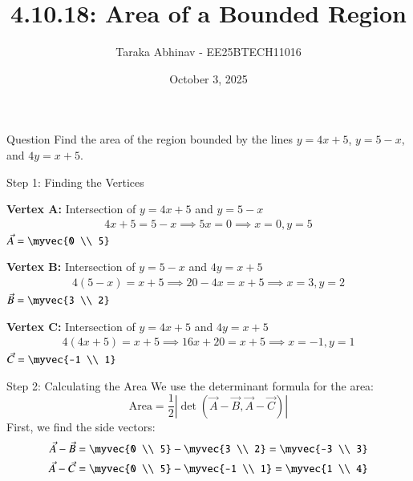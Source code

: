 \documentclass{beamer}
\begin{document}
\title{4.10.18: Area of a Bounded Region}
\date{October 3, 2025}
\author{Taraka Abhinav - EE25BTECH11016}

\frame{\titlepage}

\begin{frame}{Question}
Find the area of the region bounded by the lines $y=4x+5$, $y=5-x$, and $4y=x+5$.
\end{frame}

\begin{frame}{Step 1: Finding the Vertices}

\textbf{Vertex A:} Intersection of $y=4x+5$ and $y=5-x$
\begin{align}
    4x+5 = 5-x \implies 5x = 0 \implies x=0, y=5 \nonumber
\end{align}
$\vec{A} = \myvec{0 \\ 5}$

\textbf{Vertex B:} Intersection of $y=5-x$ and $4y=x+5$
\begin{align}
    4(5-x) = x+5 \implies 20-4x = x+5 \implies x=3, y=2 \nonumber
\end{align}
$\vec{B} = \myvec{3 \\ 2}$

\textbf{Vertex C:} Intersection of $y=4x+5$ and $4y=x+5$
\begin{align}
    4(4x+5) = x+5 \implies 16x+20 = x+5 \implies x=-1, y=1 \nonumber
\end{align}
$\vec{C} = \myvec{-1 \\ 1}$
\end{frame}

\begin{frame}{Step 2: Calculating the Area}
We use the determinant formula for the area:
\[
\text{Area} = \frac{1}{2} \left| \det(\vec{A}-\vec{B}, \vec{A}-\vec{C}) \right|
\]
First, we find the side vectors:
\begin{align}
    \vec{A}-\vec{B} &= \myvec{0 \\ 5} - \myvec{3 \\ 2} = \myvec{-3 \\ 3} \label{eq:side1} \\
    \vec{A}-\vec{C} &= \myvec{0 \\ 5} - \myvec{-1 \\ 1} = \myvec{1 \\ 4} \label{eq:side2}
\end{align}
\end{frame}
\end{document}
